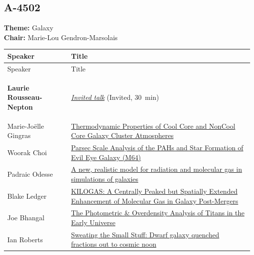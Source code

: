 \hypertarget{schedule-wednesday-morning-a-4502}{}
\subsection*{A-4502}
\textbf{Theme:} Galaxy\\
\textbf{Chair:} Marie-Lou Gendron-Marsolais\\
{\small
{}
\sloppy
\setlength{\emergencystretch}{1em}
\begin{longtable}{@{}>{\TableRaggedRight\arraybackslash\hspace{0pt}}p{} >{\TableRaggedRight\arraybackslash\hspace{0pt}}p{}@{}}
\toprule
Speaker & Title \\
\midrule
\endfirsthead
\toprule
Speaker & Title \\
\midrule
\endhead
\hypertarget{invited-laurie-rousseau-nepton-sched}{}\label{invited-page-laurie-rousseau-nepton-sched}{\bfseries\color{cascagold}Laurie Rousseau-Nepton} & \hyperlink{invited-laurie-rousseau-nepton}{\emph{Invited talk}} {\small\color{cascagold}(Invited, 30~min)} \\
\hypertarget{schedule-talk-316}{}\label{schedule-page-talk-316}Marie-Joëlle Gingras & \hyperlink{abstract-talk-316}{Thermodynamic Properties of Cool Core and NonCool Core Galaxy Cluster Atmospheres} \\
\hypertarget{schedule-talk-160}{}\label{schedule-page-talk-160}Woorak Choi & \hyperlink{abstract-talk-160}{Parsec Scale Analysis of the PAHs and Star Formation of Evil Eye Galaxy (M64)} \\
\hypertarget{schedule-talk-187}{}\label{schedule-page-talk-187}Padraic Odesse & \hyperlink{abstract-talk-187}{A new, realistic model for radiation and molecular gas in simulations of galaxies} \\
\hypertarget{schedule-talk-222}{}\label{schedule-page-talk-222}Blake Ledger & \hyperlink{abstract-talk-222}{KILOGAS: A Centrally Peaked but Spatially Extended Enhancement of Molecular Gas in Galaxy Post-Mergers} \\
\hypertarget{schedule-talk-136}{}\label{schedule-page-talk-136}Joe Bhangal & \hyperlink{abstract-talk-136}{The Photometric \& Overdensity Analysis of Titans in the Early Universe} \\
\hypertarget{schedule-talk-178}{}\label{schedule-page-talk-178}Ian Roberts & \hyperlink{abstract-talk-178}{Sweating the Small Stuff: Dwarf galaxy quenched fractions out to cosmic noon} \\
\bottomrule
\end{longtable}
}


